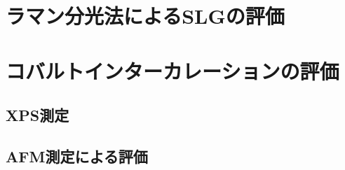 \section{ラマン分光法によるSLGの評価}

\section{コバルトインターカレーションの評価}

\subsection{XPS測定}

\subsection{AFM測定による評価}

